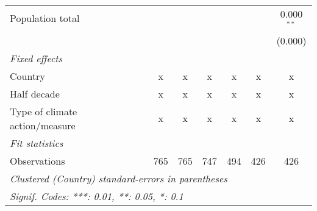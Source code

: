 \begin{tabular}{lcccccc}
   Population total                               &         &         &         &         &         & 0.000$^{**}$\\   
                                                  &         &         &         &         &         & (0.000)\\   
   \emph{Fixed effects}\\
   Country                                        & x       & x       & x       & x       & x       & x\\  
   Half decade                                    & x       & x       & x       & x       & x       & x\\  
   Type of climate action/measure                 & x       & x       & x       & x       & x       & x\\  
   \midrule \emph{Fit statistics}\\
   Observations                                   & 765     & 765     & 747     & 494     & 426     & 426\\  
   \midrule
   \multicolumn{7}{l}{\emph{Clustered (Country) standard-errors in parentheses}}\\
   \multicolumn{7}{l}{\emph{Signif. Codes: ***: 0.01, **: 0.05, *: 0.1}}\\
\end{tabular}
\par\endgroup


